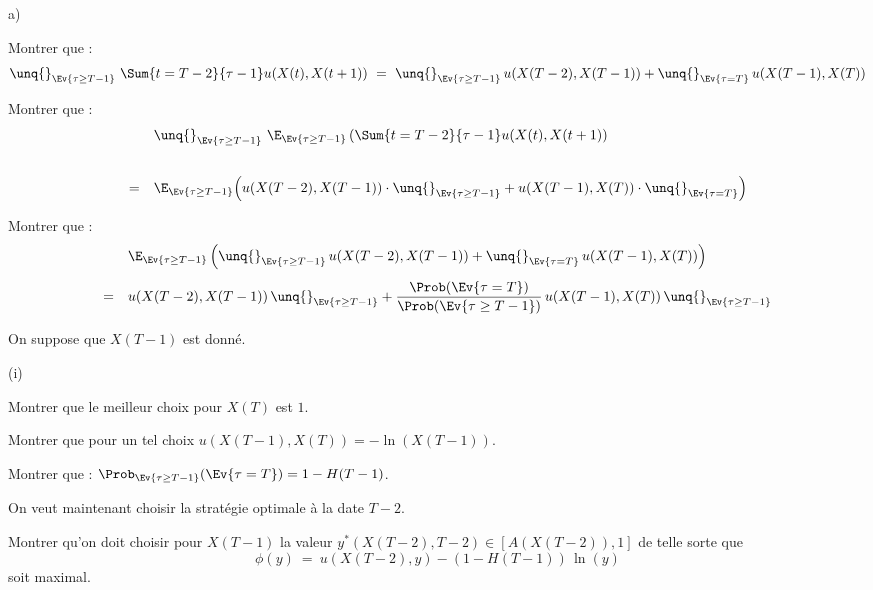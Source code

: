 \documentclass[11pt]{article}%
\begin{document}
  
  \begin{noliste}{a)}
    \setlength{\itemsep}{2mm}
    \item Montrer que :
    \[
      \unq{}_{\Ev{\tau \geq T-1}} \ \Sum{t=T-2}{\tau-1} 
      u(X(t),X(t+1))
      \ = \ \unq{}_{\Ev{\tau \geq T-1}} \, u(X(T-2),X(T-1)) + 
      \unq{}_{\Ev{\tau = T}} \, u(X(T-1),X(T))
    \]
    
    
    
    \item Montrer que :
    \[
     \begin{array}{cl}
      & \unq{}_{\Ev{\tau \geq T-1}} \ \E_{\Ev{\tau \geq T-1}} 
      \left( \Sum{t=T-2}{\tau -1} u(X(t),X(t+1)\right) 
      \\[.8cm]
      = &
      \E_{\Ev{\tau \geq T-1}} \Big( u(X(T-2),X(T-1)) \cdot
      \unq{}_{\Ev{\tau \geq T-1}} + u(X(T-1),X(T)) \cdot 
      \unq{}_{\Ev{\tau = T}}\Big)
     \end{array}
    \]
    
    
    
    
    
    
    \item Montrer que :
    \[
     \begin{array}{cl}
      & \E_{\Ev{\tau \geq T-1}}\left( \unq{}_{\Ev{\tau \geq T-1}} \, 
      u(X(T-2),X(T-1)) + \unq{}_{\Ev{\tau = T}} \, u(X(T-1), 
      X(T))\right)
      \\[.4cm]
      = &
      u(X(T-2), X(T-1)) \, \unq{}_{\Ev{\tau \geq T-1}} + 
      \dfrac{\Prob(\Ev{\tau =T})}{\Prob(\Ev{\tau \geq T-1})} \, 
      u(X(T-1), X(T)) \, \unq{}_{\Ev{\tau \geq T-1}}
     \end{array}
    \]
    
    
    
    \item On suppose que $X(T-1)$ est donné.
    \begin{nonoliste}{(i)}
      \item Montrer que le meilleur choix pour $X(T)$ est $1$.
      
      

      
      \item Montrer que pour un tel choix $u(X(T-1), X(T)) = 
      - \ln (X(T-1))$.
      
      
    \end{nonoliste}
    
    
    
    
    \item Montrer que : $\Prob_{\Ev{\tau \geq T-1}}(\Ev{\tau = T})
    =1- H(T-1)$.
    
    
    
    On veut maintenant choisir la stratégie optimale à la date $T-2$.
    
    \item Montrer qu'on doit choisir pour $X(T-1)$ la valeur $y^*(
    X(T-2),T-2) \in [A(X(T-2)),1]$ de telle sorte que 
    \[
      \phi(y) \ = \ u(X(T-2),y) - (1-H(T-1)) \, \ln(y)
    \]
    soit maximal.
  \end{noliste}
    
\end{document}
